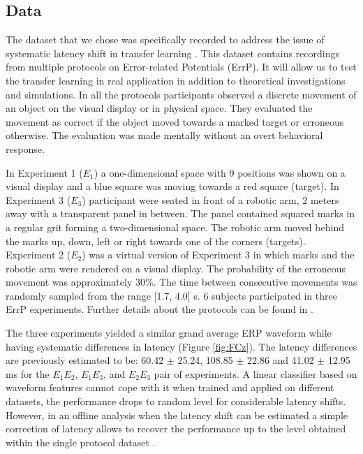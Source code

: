 \documentclass[12pt]{iopart}
\begin{document}
\subsection{Data}

The dataset that we chose was specifically recorded to address 
the issue of systematic latency shift in transfer learning \cite{iturrate_latency_2014-1}.
This dataset contains recordings from multiple protocols
on Error-related Potentials (ErrP). It will allow us to test
the transfer learning in real application in addition to theoretical
investigations and simulations.
In all the protocols participants observed a discrete movement of an object
on the visual display or in physical space.
They evaluated the movement as correct if the object moved towards a marked target or erroneous 
otherwise. The evaluation was made mentally without an overt behavioral response.

In Experiment 1 ($E_1$) a one-dimensional space with 9 positions was shown on a visual display and
a blue square was moving towards a red square (target). In Experiment 3 ($E_3$) participant were seated
in front of a robotic arm, 2 meters away with a transparent panel in between.
The panel contained squared marks in a regular grit forming a two-dimensional space.
The robotic arm moved behind the marks up, down, left or right 
towards one of the corners (targets).
Experiment 2 ($E_2$) was a virtual version of Experiment 3 in which marks and the robotic arm
were rendered on a visual display.
The probability of the erroneous
movement was approximately 30\%. The time between consecutive movements was randomly sampled
from the range [1.7, 4.0] s. 
6 subjects participated in three ErrP experiments.
Further details about the protocols can be found in \cite{iturrate_latency_2014-1}.

The three experiments yielded a similar grand average ERP waveform 
while having systematic differences in latency (Figure \ref{fig:FCz}).
The latency differences are previously estimated to be:
60.42 $\pm$ 25.24, 108.85 $\pm$ 22.86 and 41.02 $\pm$ 12.95 ms
for the $E_1 E_2$, $E_1 E_3$, and $E_2 E_3$ pair of experiments.
A linear classifier
based on waveform features cannot cope with it when trained and applied
on different datasets, the performance drops to random level
for considerable latency shifts. However, in an offline analysis
when the latency shift can be estimated
a simple correction of latency allows to recover the performance up to the level
obtained within the single protocol dataset \cite{iturrate_latency_2014-1}.
\end{document}

